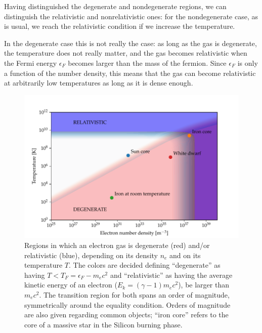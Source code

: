 \documentclass[main.tex]{subfiles}
\begin{document}
Having distinguished the degenerate and nondegenerate regions, we can distinguish the relativistic and nonrelativistic ones: for the nondegenerate case, as is usual, we reach the relativistic condition if we increase the temperature. 

In the degenerate case this is not really the case: as long as the gas is degenerate, the temperature does not really matter, and the gas becomes relativistic when the Fermi energy \(\epsilon _F\) becomes larger than the mass of the fermion.
Since \(\epsilon _F\) is only a function of the number density, this means that the gas can become relativistic at arbitrarily low temperatures as long as it is dense enough.

\begin{figure}[ht]
\centering
\includegraphics[width=\textwidth]{figures/relativisticity_degeneracy.pdf}
\caption{Regions in which an electron gas is degenerate (red) and/or relativistic (blue), depending on its density \(n_e\) and on its temperature \(T\). The colors are decided defining ``degenerate'' as having \(T < T_F = \epsilon _F - m_e c^2\) and ``relativistic'' as having the average kinetic energy of an electron (\(E_k = (\gamma - 1) m_e c^2\)), be larger than \(m_e c^2\). The transition region for both spans an order of magnitude, symmetrically around the equality condition. 
Orders of magnitude are also given regarding common objects; ``iron core'' refers to the core of a massive star in the Silicon burning phase.}
\label{fig:relativisticity_degeneracy}
\end{figure}
\end{document}
